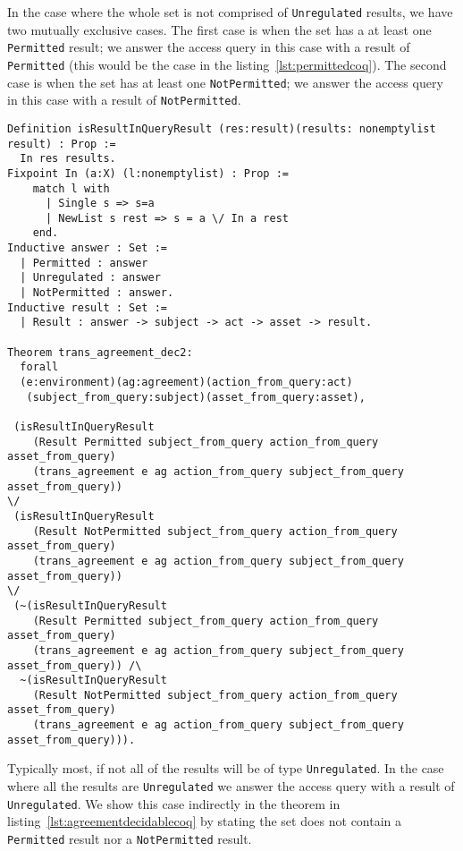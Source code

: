 \documentclass[runningheads,a4paper]{llncs}
\newcommand{\syn}{\texttt}
\begin{document}
In the case where the whole set is not comprised of \syn{Unregulated} results, we have two mutually exclusive cases. The first case is when the set has a at least one \syn{Permitted} result; we answer the access query in this case with a result of \syn{Permitted} (this would be the case in the listing~\ref{lst:permittedcoq}). The second case is when the set has at least one \syn{NotPermitted}; we answer the access query in this case with a result of \syn{NotPermitted}. 


\begin{lstlisting}
Definition isResultInQueryResult (res:result)(results: nonemptylist result) : Prop :=
  In res results.
Fixpoint In (a:X) (l:nonemptylist) : Prop :=
    match l with
      | Single s => s=a
      | NewList s rest => s = a \/ In a rest
    end.
Inductive answer : Set :=
  | Permitted : answer
  | Unregulated : answer
  | NotPermitted : answer.
Inductive result : Set :=
  | Result : answer -> subject -> act -> asset -> result.
  
Theorem trans_agreement_dec2:
  forall
  (e:environment)(ag:agreement)(action_from_query:act)
   (subject_from_query:subject)(asset_from_query:asset),
   
 (isResultInQueryResult 
    (Result Permitted subject_from_query action_from_query asset_from_query)
    (trans_agreement e ag action_from_query subject_from_query asset_from_query)) 
\/
 (isResultInQueryResult 
    (Result NotPermitted subject_from_query action_from_query asset_from_query)
    (trans_agreement e ag action_from_query subject_from_query asset_from_query))
\/
 (~(isResultInQueryResult 
    (Result Permitted subject_from_query action_from_query asset_from_query)
    (trans_agreement e ag action_from_query subject_from_query asset_from_query)) /\
  ~(isResultInQueryResult 
    (Result NotPermitted subject_from_query action_from_query asset_from_query)
    (trans_agreement e ag action_from_query subject_from_query asset_from_query))).
\end{lstlisting}

Typically most, if not all of the results will be of type \syn{Unregulated}. In the case where all the results are \syn{Unregulated} we answer the access query with a result of \syn{Unregulated}. We show this case indirectly in the theorem in listing~\ref{lst:agreementdecidablecoq} by stating the set does not contain a \syn{Permitted} result nor a \syn{NotPermitted} result. 
\end{document}
